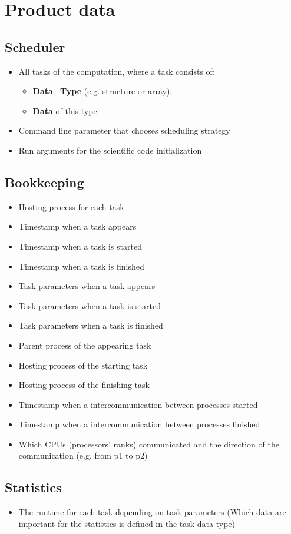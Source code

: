 {


\setcounter{funcD}{10}
\renewcommand{\labelitemi}{
	\ifnum \value{funcD}<10$/D 0\arabic{funcD} /$\addtocounter{funcD}{10}
	\else $/D \arabic{funcD} /$\addtocounter{funcD}{10}\fi
	}
\section{Product data}

	\subsection{Scheduler}
		\begin{itemize}
			\item All tasks of the computation, where a task consists of:
				\begin{itemize}
					\item \textbf{Data\_Type} (e.g. structure or array);
					\item \textbf{Data} of this type
				\end{itemize}
			\item Command line parameter that chooses scheduling strategy
			\item Run arguments for the scientific code initialization
		\end{itemize}


	\subsection{Bookkeeping}
		\begin{itemize}
			\item Hosting process for each task
			\item Timestamp when a task appears
			\item Timestamp when a task is started
			\item Timestamp when a task is finished
			\item Task parameters when a task appears
			\item Task parameters when a task is started
			\item Task parameters when a task is finished
			\item Parent process of the appearing task
			\item Hosting process of the starting task
			\item Hosting process of the finishing task
			\item Timestamp when a intercommunication between processes started
			\item Timestamp when a intercommunication between processes finished
			\item Which CPUs (processors' ranks) communicated and the direction of the communication (e.g. from p1 to p2) 
		\end{itemize}
			
			
	\subsection{Statistics}
		\begin{itemize}
			\item The runtime for each task depending on task parameters (Which data are important for the statistics is defined in the task data type)
		\end{itemize}
}